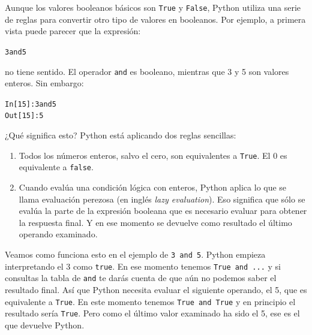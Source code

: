 \documentclass[10pt,a4paper]{article}\usepackage[]{graphicx}\usepackage[]{color}
\makeatletter
\newenvironment{kframe}{%
 \def\at@end@of@kframe{}%
 \ifinner\ifhmode%
  \def\at@end@of@kframe{\end{minipage}}%
  \begin{minipage}{\columnwidth}%
 \fi\fi%
 \def\FrameCommand##1{\hskip\@totalleftmargin \hskip-\fboxsep
 \colorbox{shadecolor}{##1}\hskip-\fboxsep
     \hskip-\linewidth \hskip-\@totalleftmargin \hskip\columnwidth}%
 \MakeFramed {\advance\hsize-\width
   \@totalleftmargin\z@ \linewidth\hsize
   \@setminipage}}%
 {\par\unskip\endMakeFramed%
 \at@end@of@kframe}
\newenvironment{knitrout}{}{} %
\makeatother
\begin{document}
Aunque los valores booleanos básicos son {\tt True} y {\tt False}, Python utiliza una serie de reglas para convertir otro tipo de valores en booleanos. Por ejemplo, a primera vista puede parecer que la expresión:
\begin{knitrout}
\color{fgcolor}\begin{kframe}
\begin{alltt}
3 and 5
\end{alltt}
\end{kframe}
\end{knitrout}
no tiene sentido. El operador {\tt and} es booleano, mientras que 3 y 5 son valores enteros.  Sin embargo:
\begin{knitrout}
\color{fgcolor}\begin{kframe}
\begin{alltt}
In [15]: 3 and 5
Out[15]: 5
\end{alltt}
\end{kframe}
\end{knitrout}
¿Qué significa esto? Python está aplicando dos reglas sencillas:
\begin{enumerate}
\item Todos los números enteros, salvo el cero, son equivalentes a {\tt True}. El 0 es equivalente a {\tt false}.
\item Cuando evalúa una condición lógica con enteros, Python aplica lo que se llama {\sf evaluación perezosa} (en inglés {\em lazy evaluation}). Eso significa que sólo se evalúa la parte de la expresión booleana que es necesario evaluar para obtener la respuesta final. Y en ese momento se devuelve como resultado el último operando examinado.
\end{enumerate}
Veamos como funciona esto en el ejemplo de {\tt 3 and 5}. Python empieza interpretando el 3 como {\tt true}. En ese momento tenemos {\tt True and ...} y si consultas la tabla de {\tt and} te darás cuenta de que aún no podemos saber el resultado final. Así que Python necesita evaluar el siguiente operando, el 5, que es equivalente a {\tt True}. En este momento tenemos {\tt True and True} y en principio el resultado sería {\tt True}. Pero como el último valor examinado ha sido el 5, ese es el que devuelve Python.
\end{document}
